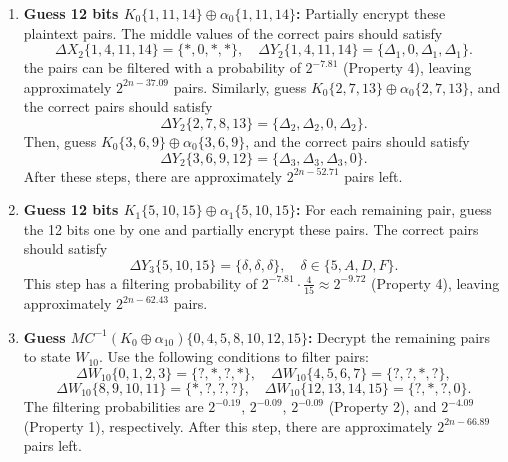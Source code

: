 \documentclass[journal=tosc,preprint]{iacrtrans}
\begin{document}
    \begin{enumerate}
        \item \textbf{Guess 12 bits $K_0\{1, 11, 14\} \oplus \alpha_0\{1, 11, 14\}$:}
              Partially encrypt these plaintext pairs. The middle values of the correct pairs should satisfy
              \[
                  \Delta X_2\{1, 4, 11, 14\} = \{\ast, 0, \ast, \ast\}, \quad \Delta Y_2\{1, 4, 11, 14\} = \{\Delta_1, 0, \Delta_1, \Delta_1\}.
              \]
              the pairs can be filtered with a probability of $2^{-7.81}$ (Property 4), leaving approximately $2^{2n-37.09}$ pairs.
              Similarly, guess $K_0\{2, 7, 13\} \oplus \alpha_0\{2, 7, 13\}$, and the correct pairs should satisfy
              \[
                  \Delta Y_2\{2, 7, 8, 13\} = \{\Delta_2, \Delta_2, 0, \Delta_2\}.
              \]
              Then, guess $K_0\{3, 6, 9\} \oplus \alpha_0\{3, 6, 9\}$, and the correct pairs should satisfy
              \[
                  \Delta Y_2\{3, 6, 9, 12\} = \{\Delta_3, \Delta_3, \Delta_3, 0\}.
              \]
              After these steps, there are approximately $2^{2n-52.71}$ pairs left.

        \item \textbf{Guess 12 bits $K_1\{5, 10, 15\} \oplus \alpha_1\{5, 10, 15\}$:}
              For each remaining pair, guess the 12 bits one by one and partially encrypt these pairs. The correct pairs should satisfy
              \[
                  \Delta Y_3\{5, 10, 15\} = \{\delta, \delta, \delta\}, \quad \delta \in \{5, A, D, F\}.
              \]
              This step has a filtering probability of $2^{-7.81} \cdot \frac{4}{15} \approx 2^{-9.72}$ (Property 4), leaving approximately $2^{2n-62.43}$ pairs.

        \item \textbf{Guess $MC^{-1}(K_0 \oplus \alpha_{10})\{0, 4, 5, 8, 10, 12, 15\}$:}
              Decrypt the remaining pairs to state $W_{10}$. Use the following conditions to filter pairs:
              \[
                  \Delta W_{10}\{0, 1, 2, 3\} = \{?, \ast, ?, \ast\}, \quad \Delta W_{10}\{4, 5, 6, 7\} = \{?, ?, \ast, ?\},
              \]
              \[
                  \Delta W_{10}\{8, 9, 10, 11\} = \{\ast, ?, ?, ?\}, \quad \Delta W_{10}\{12, 13, 14, 15\} = \{?, \ast, ?, 0\}.
              \]
              The filtering probabilities are $2^{-0.19}$, $2^{-0.09}$, $2^{-0.09}$ (Property 2), and $2^{-4.09}$ (Property 1), respectively. After this step, there are approximately $2^{2n-66.89}$ pairs left.


\end{enumerate}
\end{document}
